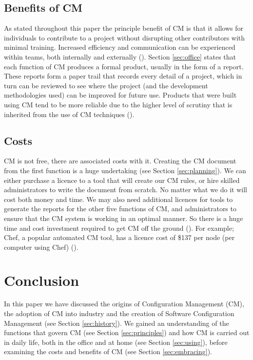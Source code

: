 \documentclass[cmpstyle]{ueacmpstyle}
\begin{document}
		\subsection{Benefits of CM} \label{sec:benefits}
		As stated throughout this paper the principle benefit of CM is that it allows for individuals to contribute to a project without disrupting other contributors with minimal training. Increased efficiency and communication can be experienced within teams, both internally and externally (\cite{unexpected-benefits}). Section \ref{sec:office} states that each function of CM produces a formal product, usually in the form of a report. These reports form a paper trail that records every detail of a project, which in turn can be reviewed to see where the project (and the development methodologies used) can be improved for future use. Products that were built using CM tend to be more reliable due to the higher level of scrutiny that is inherited from the use of CM techniques (\cite{benefits}).
		
		\subsection{Costs} \label{sec:costs}
		CM is not free, there are associated costs with it. Creating the CM document from the first function is a huge undertaking (see Section \ref{sec:planning}). We can either purchase a licence to a tool that will create our CM rules, or hire skilled administrators to write the document from scratch. No matter what we do it will cost both money and time. We may also need additional licences for tools to generate the reports for the other five functions of CM, and administrators to ensure that the CM system is working in an optimal manner. So there is a huge time and cost investment required to get CM off the ground (\cite{costs}). For example; Chef, a popular automated CM tool, has a licence cost of \$137 per node (per computer using Chef) (\cite{chef-pricing}).
		
	\section{Conclusion} \label{sec:conc}
	In this paper we have discussed the origins of Configuration Management (CM), the adoption of CM into industry and the creation of Software Configuration Management (see Section \ref{sec:history}). We gained an understanding of the functions that govern CM (see Section \ref{sec:principles}) and how CM is carried out in daily life, both in the office and at home (see Section \ref{sec:using}), before examining the costs and benefits of CM (see Section \ref{sec:embracing}).
	
\end{document}
